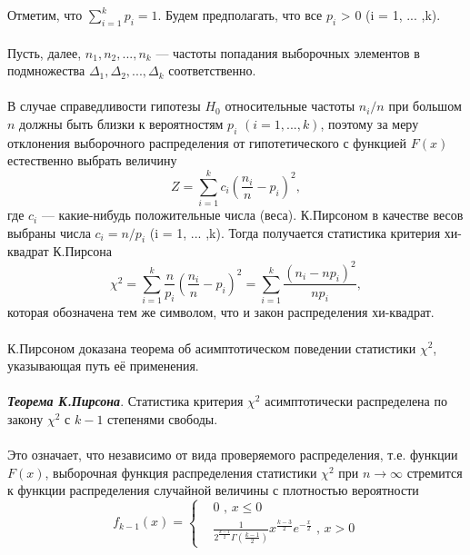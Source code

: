\documentclass{article}
\begin{document}
\\\\
Отметим, что $\sum_{i=1}^{k}{p_{i}} = 1$.
Будем предполагать, что все $p_{i}$ > 0 (i = 1, ... ,k).
\\\\
Пусть, далее, $n_{1},n_{2}, ... ,n_{k}$ — частоты попадания выборочных элементов в подмножества $\Delta_{1},\Delta_{2}, ... ,\Delta_{k}$ соответственно.
\\\\
В случае справедливости гипотезы $H_{0}$ относительные частоты $n_{i}/n$ при большом $n$ должны быть близки к вероятностям $p_{i}$ $(i = 1, ... ,k)$, поэтому за меру отклонения выборочного распределения от гипотетического с функцией $F(x)$ естественно выбрать величину
\begin{equation}
Z = \sum_{i = 1}^{k}{c_{i}(\frac{n_{i}}{n} - p_{i})^{2}}, 
\label{Z}
\end{equation}
где $c_{i}$ — какие-нибудь положительные числа (веса). К.Пирсоном в качестве весов выбраны числа $c_{i} = n/p_{i}$ (i = 1, ... ,k). Тогда получается статистика критерия хи-квадрат К.Пирсона
\begin{equation}
\chi^{2} = \sum_{i = 1}^{k}{\frac{n}{p_{i}}(\frac{n_{i}}{n} - p_{i})^{2}} = \sum_{i = 1}^{k}{\frac{(n_{i} - np_{i})^{2}}{np_{i}}}, 
\label{chi_2}
\end{equation}
которая обозначена тем же символом, что и закон распределения хи-квадрат.
\\\\
К.Пирсоном доказана теорема об асимптотическом поведении статистики $\chi^{2}$, указывающая путь её применения.
\\\\
\textbf{\textit{Теорема К.Пирсона}}. Статистика критерия $\chi^{2}$ асимптотически распределена по закону $\chi^{2}$ с $k-1$ степенями свободы.
\\\\
Это означает, что независимо от вида проверяемого распределения, т.е. функции $F(x)$, выборочная функция распределения статистики $\chi^{2}$ при $n \rightarrow \infty$  стремится к функции распределения случайной величины с плотностью вероятности 
\begin{equation}
f_{k - 1}(x) = 
\begin{cases}
& 0 \text{ , } x  \leq 0  \\ 
& \frac{1}{2^{\frac{k-1}{2}}\Gamma(\frac{k-1}{2})}x^{\frac{k-3}{2}}e^{-\frac{x}{2}}
\text{ , } x>0 
\end{cases}
\label{f_k-1}
\end{equation}
\end{document}
